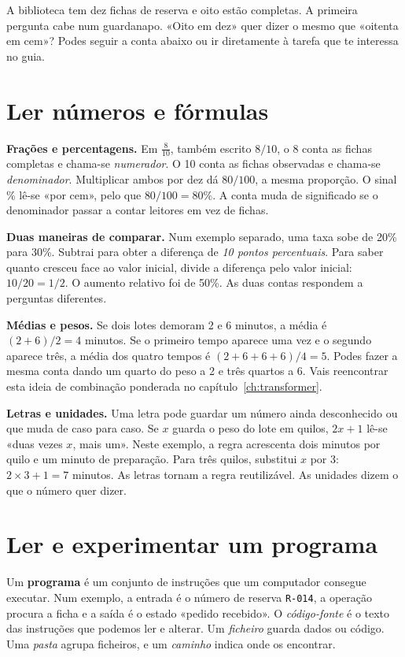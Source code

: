 \ficcao A biblioteca tem dez fichas de reserva e oito estão completas. A primeira pergunta cabe num guardanapo. «Oito em dez» quer dizer o mesmo que «oitenta em cem»? Podes seguir a conta abaixo ou ir diretamente à tarefa que te interessa no guia.

\section*{Ler números e fórmulas}
\label{sec:ler-numeros}

\textbf{Frações e percentagens.} Em $\frac{8}{10}$, também escrito $8/10$, o 8 conta as fichas completas e chama-se \emph{numerador}. O 10 conta as fichas observadas e chama-se \emph{denominador}. Multiplicar ambos por dez dá $80/100$, a mesma proporção. O sinal \% lê-se «por cem», pelo que $80/100=80\%$. A conta muda de significado se o denominador passar a contar leitores em vez de fichas.

\textbf{Duas maneiras de comparar.} Num exemplo separado, uma taxa sobe de 20\% para 30\%. Subtrai para obter a diferença de \emph{10 pontos percentuais}. Para saber quanto cresceu face ao valor inicial, divide a diferença pelo valor inicial: $10/20=1/2$. O aumento relativo foi de 50\%. As duas contas respondem a perguntas diferentes.

\textbf{Médias e pesos.} Se dois lotes demoram 2 e 6 minutos, a média é $(2+6)/2=4$ minutos. Se o primeiro tempo aparece uma vez e o segundo aparece três, a média dos quatro tempos é $(2+6+6+6)/4=5$. Podes fazer a mesma conta dando um quarto do peso a 2 e três quartos a 6. Vais reencontrar esta ideia de combinação ponderada no capítulo~\ref{ch:transformer}.

\textbf{Letras e unidades.} Uma letra pode guardar um número ainda desconhecido ou que muda de caso para caso. Se $x$ guarda o peso do lote em quilos, $2x+1$ lê-se «duas vezes $x$, mais um». Neste exemplo, a regra acrescenta dois minutos por quilo e um minuto de preparação. Para três quilos, substitui $x$ por $3$: $2\times3+1=7$ minutos. As letras tornam a regra reutilizável. As unidades dizem o que o número quer dizer.

\clearpage
\thispagestyle{plain}
\section*{Ler e experimentar um programa}
\label{sec:ler-programas}

Um \textbf{programa} é um conjunto de instruções que um computador consegue executar. Num exemplo, a entrada é o número de reserva \texttt{R-014}, a operação procura a ficha e a saída é o estado «pedido recebido». O \emph{código-fonte} é o texto das instruções que podemos ler e alterar. Um \emph{ficheiro} guarda dados ou código. Uma \emph{pasta} agrupa ficheiros, e um \emph{caminho} indica onde os encontrar.

